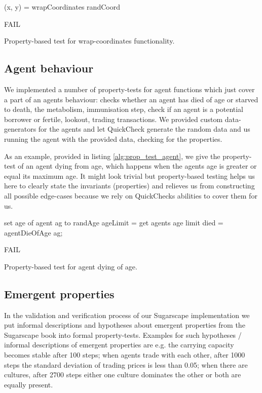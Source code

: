 \begin{algorithm}
(x, y) = wrapCoordinates randCoord\;

 {
  FAIL\;
}
\caption{Property-based test for wrap-coordinates functionality.}
\end{algorithm}
\label{alg:prop_test_wrapcoords}

\subsection{Agent behaviour}
We implemented a number of property-tests for agent functions which just cover a part of an agents behaviour: checks whether an agent has died of age or starved to death, the metabolism, immunisation step, check if an agent is a potential borrower or fertile, lookout, trading transactions. We provided custom data-generators for the agents and let QuickCheck generate the random data and us running the agent with the provided data, checking for the properties. 

As an example, provided in listing \ref{alg:prop_test_agent}, we give the property-test of an agent dying from age, which happens when the agents age is greater or equal its maximum age. It might look trivial but property-based testing helps us here to clearly state the invariants (properties) and relieves us from constructing all possible edge-cases because we rely on QuickChecks abilities to cover them for us.

\begin{algorithm}
set age of agent ag to randAge\;
ageLimit = get agents age limit\; 
died = agentDieOfAge ag;\

 {
  FAIL\;
}
\caption{Property-based test for agent dying of age.}
\end{algorithm}
\label{alg:prop_test_agent}

\subsection{Emergent properties}
In the validation and verification process of our Sugarscape implementation we put informal descriptions and hypotheses about emergent properties from the Sugarscape book into formal property-tests. Examples for such hypotheses / informal descriptions of emergent properties are e.g. the carrying capacity becomes stable after 100 steps; when agents trade with each other, after 1000 steps the standard deviation of trading prices is less than 0.05; when there are cultures, after 2700 steps either one culture dominates the other or both are equally present.

